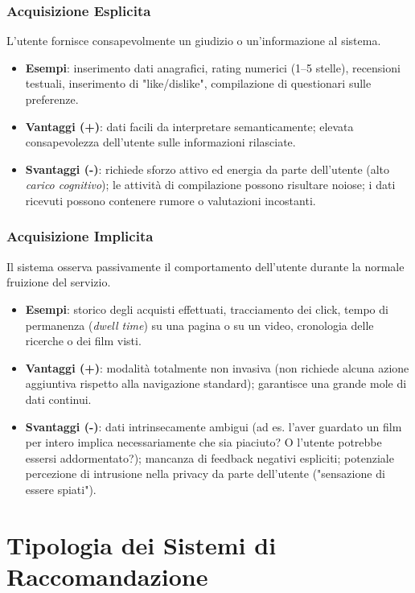 \subsubsection{Acquisizione Esplicita}
L'utente fornisce consapevolmente un giudizio o un'informazione al sistema.
\begin{itemize}
    \item \textbf{Esempi}: inserimento dati anagrafici, rating numerici (1--5 stelle), recensioni testuali, inserimento di "like/dislike", compilazione di questionari sulle preferenze.
    \item \textbf{Vantaggi (+)}: dati facili da interpretare semanticamente; elevata consapevolezza dell'utente sulle informazioni rilasciate.
    \item \textbf{Svantaggi (-)}: richiede sforzo attivo ed energia da parte dell'utente (alto \textit{carico cognitivo}); le attività di compilazione possono risultare noiose; i dati ricevuti possono contenere rumore o valutazioni incostanti.
\end{itemize}

\subsubsection{Acquisizione Implicita}
Il sistema osserva passivamente il comportamento dell'utente durante la normale fruizione del servizio.
\begin{itemize}
    \item \textbf{Esempi}: storico degli acquisti effettuati, tracciamento dei click, tempo di permanenza (\textit{dwell time}) su una pagina o su un video, cronologia delle ricerche o dei film visti.
    \item \textbf{Vantaggi (+)}: modalità totalmente non invasiva (non richiede alcuna azione aggiuntiva rispetto alla navigazione standard); garantisce una grande mole di dati continui.
    \item \textbf{Svantaggi (-)}: dati intrinsecamente ambigui (ad es. l'aver guardato un film per intero implica necessariamente che sia piaciuto? O l'utente potrebbe essersi addormentato?); mancanza di feedback negativi espliciti; potenziale percezione di intrusione nella privacy da parte dell'utente ("sensazione di essere spiati").
\end{itemize}


\section{Tipologia dei Sistemi di Raccomandazione}

